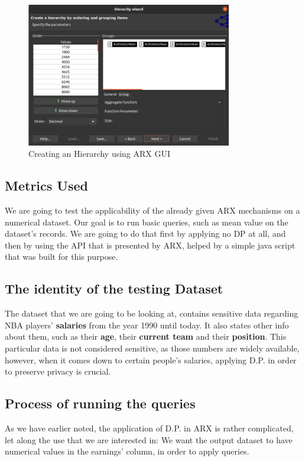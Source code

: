 \begin{figure}[!htb]\centering
    \includegraphics[width=0.8\textwidth]{images/hierarchies.png}
    \caption{Creating an Hierarchy using ARX GUI}
\end{figure}


\subsection{Metrics Used}
We are going to test the applicability of the already given ARX mechanisms on a numerical dataset. Our goal is to run basic queries, such as mean value on the dataset's records. We are going to do that first by applying no DP at all, and then by using the API that is presented by ARX, helped by a simple java script that was built for this purpose.


\subsection{The identity of the testing Dataset}
The dataset that we are going to be looking at, contains sensitive data regarding NBA players' \textbf{salaries} from the year 1990 until today. It also states other info about them, such as their \textbf{age}, their\textbf{ current team }and their \textbf{position}. This particular data is not considered sensitive, as those numbers are widely available, however, when it comes down to certain people's salaries, applying D.P. in order to preserve privacy is crucial.

\subsection{Process of running the queries}
As we have earlier noted, the application of D.P. in ARX is rather complicated, let along the use that we are interested in: We want the output dataset to have numerical values in the earnings' column, in order to apply queries. 

